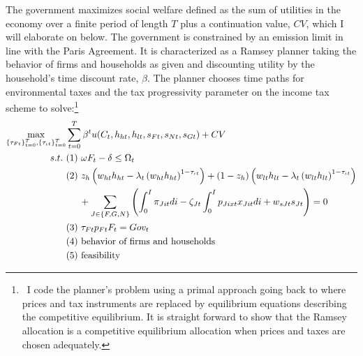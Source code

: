 The government maximizes social welfare defined as the sum of utilities in the economy over a finite period of length $T$ plus a continuation value, $CV$, which I will elaborate on below. The government is constrained by an emission limit in line with the Paris Agreement.  
It is characterized as a Ramsey planner taking the behavior of firms and households as given and discounting utility by the household's time discount rate, $\beta$.
The planner chooses time paths for environmental taxes and the tax progressivity parameter on the income tax scheme to solve:\footnote{\ I code the planner's problem using a primal approach going back to \cite{Lucas1983OptimalCapital} where prices and tax instruments are replaced by equilibrium equations describing the competitive equilibrium. It is straight forward to show that the Ramsey allocation is a competitive equilibrium allocation when prices and taxes are chosen adequately.}
\begin{align*}
\underset{\{\tau_{Ft}\}_{t=0}^{T},\{\tau_{\iota t}\}_{t=0}^{T}}{\max}&\sum_{t=0}^{T}\beta^t u(C_{t}, h_{ht}, h_{lt}, s_{Ft}, s_{Nt}, s_{Gt})%
+ CV\\
s.t.\ %
& (1)\ \omega F_{t} -\delta \leq \Omega_t %
\\ %
& (2)\ z_h\left(w_{ht}h_{ht}-\lambda_t \left(w_{ht}h_{ht}\right)^{1-\tau_{\iota t}}\right)+(1-z_h)\left(w_{lt}h_{lt}-\lambda_t\left(w_{lt}h_{lt}\right)^{1-\tau_{\iota t}}\right) \\
& \hspace{5mm} +\sum_{J\in\{F,G,N\}}\left(\int_{0}^{I}\pi_{Jit}di-\zeta_{Jt}\int_{0}^{I}p_{Jixt}x_{Jit}di+w_{sJt}s_{Jt}\right)= 0\\ %
& (3)\ \tau_{Ft}p_{Ft}F_{t} = Gov_t\\
& (4)\ \text{behavior of firms and households}\\
& (5)\ \text{feasibility}
\end{align*}

